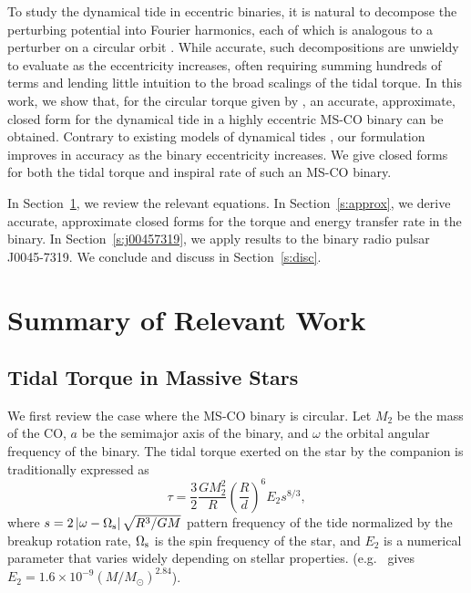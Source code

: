 \documentclass[
        fleqn,
        usenatbib,
    ]{mnras}
\newcommand*{\abs}[1]{\left|#1\right|}
\newcommand*{\p}[1]{\left(#1\right)}
\begin{document}
To study the dynamical tide in eccentric binaries, it is natural to decompose
the perturbing potential into Fourier harmonics, each of which is analogous to a
perturber on a circular orbit \citep[e.g.][]{sl, vlf}. While accurate, such
decompositions are unwieldy to evaluate as the eccentricity increases, often
requiring summing hundreds of terms and lending little intuition to the broad
scalings of the tidal torque. In this work, we show that, for the circular
torque given by \citet{kushnir}, an accurate, approximate, closed form for the
dynamical tide in a highly eccentric MS-CO binary can be obtained. Contrary to
existing models of dynamical tides \citep[e.g.][]{vigna2020common}, our
formulation improves in accuracy as the binary eccentricity increases.  We give
closed forms for both the tidal torque and inspiral rate of such an MS-CO
binary.

In Section~\ref{s:background}, we review the relevant equations. In
Section~\ref{s:approx}, we derive accurate, approximate closed forms for the
torque and energy transfer rate in the binary. In Section~\ref{s:j00457319}, we
apply results to the binary radio pulsar J0045-7319.%
We conclude and discuss in Section~\ref{s:disc}.

\section{Summary of Relevant Work}\label{s:background}

\subsection{Tidal Torque in Massive Stars}

We first review the case where the MS-CO binary is circular. Let $M_2$ be the
mass of the CO, $a$ be the semimajor axis of the binary, and $\omega$ the
orbital angular frequency of the binary. The tidal torque exerted on the star by
the companion is traditionally expressed as \citep{zahn1975dynamical}
\begin{equation}
    \tau = \frac{3}{2}\frac{GM_2^2}{R}\p{\frac{R}{d}}^6 E_2 s^{8/3},
\end{equation}
where $s = 2\abs{\omega - \Omega_{\rm s}}\sqrt{R^3/GM}$ pattern frequency of the
tide normalized by the breakup rotation rate, $\Omega_{\rm s}$ is the spin
frequency of the star, and $E_2$ is a numerical parameter that varies widely
depending on stellar properties. (e.g.\ \citet{hurley2002evolution} gives $E_2 =
1.6 \times 10^{-9}\p{M / M_{\odot}}^{2.84}$).
\end{document}
